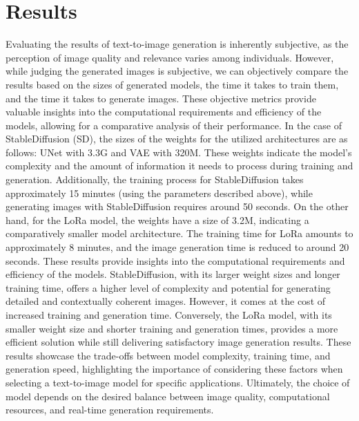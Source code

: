 \documentclass[conference]{IEEEtran}
\begin{document}
\section{Results}
Evaluating the results of text-to-image generation is inherently subjective, as the perception of image quality and relevance varies among individuals. However, while judging the generated images is subjective, we can objectively compare the results based on the sizes of generated models, the time it takes to train them, and the time it takes to generate images. These objective metrics provide valuable insights into the computational requirements and efficiency of the models, allowing for a comparative analysis of their performance.
In the case of StableDiffusion (SD), the sizes of the weights for the utilized architectures are as follows: UNet with 3.3G and VAE with 320M. These weights indicate the model's complexity and the amount of information it needs to process during training and generation. Additionally, the training process for StableDiffusion takes approximately 15 minutes (using the parameters described above), while generating images with StableDiffusion requires around 50 seconds.
On the other hand, for the LoRa model, the weights have a size of 3.2M, indicating a comparatively smaller model architecture. The training time for LoRa amounts to approximately 8 minutes, and the image generation time is reduced to around 20 seconds.
These results provide insights into the computational requirements and efficiency of the models. StableDiffusion, with its larger weight sizes and longer training time, offers a higher level of complexity and potential for generating detailed and contextually coherent images. However, it comes at the cost of increased training and generation time. Conversely, the LoRa model, with its smaller weight size and shorter training and generation times, provides a more efficient solution while still delivering satisfactory image generation results.
These results showcase the trade-offs between model complexity, training time, and generation speed, highlighting the importance of considering these factors when selecting a text-to-image model for specific applications. Ultimately, the choice of model depends on the desired balance between image quality, computational resources, and real-time generation requirements.

%
%
\printbibliography[heading=bibintoc]
\end{document}
